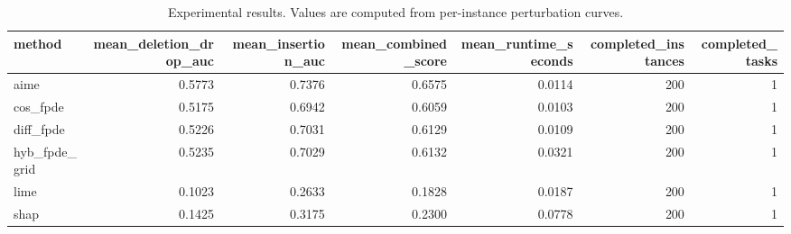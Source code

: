 \begin{table}[t]
\caption{Experimental results. Values are computed from per-instance perturbation curves.}
\label{tab:main_results_computed}
\centering
\begin{tabular}{lrrrrrr}
\toprule
method & mean\_deletion\_drop\_auc & mean\_insertion\_auc & mean\_combined\_score & mean\_runtime\_seconds & completed\_instances & completed\_tasks \\
\midrule
aime & 0.5773 & 0.7376 & 0.6575 & 0.0114 & 200 & 1 \\
cos\_fpde & 0.5175 & 0.6942 & 0.6059 & 0.0103 & 200 & 1 \\
diff\_fpde & 0.5226 & 0.7031 & 0.6129 & 0.0109 & 200 & 1 \\
hyb\_fpde\_grid & 0.5235 & 0.7029 & 0.6132 & 0.0321 & 200 & 1 \\
lime & 0.1023 & 0.2633 & 0.1828 & 0.0187 & 200 & 1 \\
shap & 0.1425 & 0.3175 & 0.2300 & 0.0778 & 200 & 1 \\
\bottomrule
\end{tabular}

\end{table}
